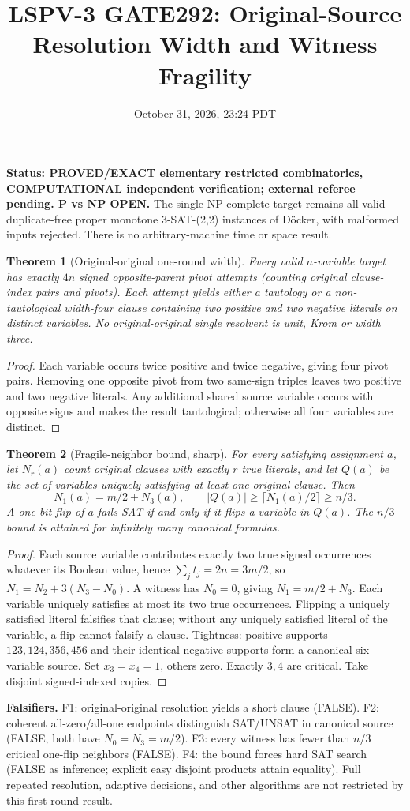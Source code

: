 \documentclass[11pt]{article}
\title{LSPV-3 GATE292: Original-Source Resolution Width and Witness Fragility}
\date{October 31, 2026, 23:24 PDT}
\newtheorem{theorem}{Theorem}
\begin{document}
\maketitle
\noindent\textbf{Status: PROVED/EXACT elementary restricted combinatorics, COMPUTATIONAL independent verification; external referee pending. P vs NP OPEN.}
The single NP-complete target remains all valid duplicate-free proper monotone 3-SAT-(2,2) instances of D\"ocker, with malformed inputs rejected. There is no arbitrary-machine time or space result.
\begin{theorem}[Original-original one-round width]
Every valid $n$-variable target has exactly $4n$ signed opposite-parent pivot attempts (counting original clause-index pairs and pivots). Each attempt yields either a tautology or a non-tautological width-four clause containing two positive and two negative literals on distinct variables. No original-original single resolvent is unit, Krom or width three.
\end{theorem}
\begin{proof}Each variable occurs twice positive and twice negative, giving four pivot pairs. Removing one opposite pivot from two same-sign triples leaves two positive and two negative literals. Any additional shared source variable occurs with opposite signs and makes the result tautological; otherwise all four variables are distinct.\end{proof}
\begin{theorem}[Fragile-neighbor bound, sharp]
For every satisfying assignment $a$, let $N_r(a)$ count original clauses with exactly $r$ true literals, and let $Q(a)$ be the set of variables uniquely satisfying at least one original clause. Then
\[
N_1(a)=m/2+N_3(a),\qquad |Q(a)|\ge\lceil N_1(a)/2\rceil\ge n/3.
\]
A one-bit flip of $a$ fails SAT if and only if it flips a variable in $Q(a)$. The $n/3$ bound is attained for infinitely many canonical formulas.
\end{theorem}
\begin{proof}Each source variable contributes exactly two true signed occurrences whatever its Boolean value, hence $\sum_jt_j=2n=3m/2$, so $N_1=N_2+3(N_3-N_0)$. A witness has $N_0=0$, giving $N_1=m/2+N_3$. Each variable uniquely satisfies at most its two true occurrences. Flipping a uniquely satisfied literal falsifies that clause; without any uniquely satisfied literal of the variable, a flip cannot falsify a clause. Tightness: positive supports $123,124,356,456$ and their identical negative supports form a canonical six-variable source. Set $x_3=x_4=1$, others zero. Exactly $3,4$ are critical. Take disjoint signed-indexed copies.\end{proof}
\noindent\textbf{Falsifiers.} F1: original-original resolution yields a short clause (FALSE). F2: coherent all-zero/all-one endpoints distinguish SAT/UNSAT in canonical source (FALSE, both have $N_0=N_3=m/2$). F3: every witness has fewer than $n/3$ critical one-flip neighbors (FALSE). F4: the bound forces hard SAT search (FALSE as inference; explicit easy disjoint products attain equality). Full repeated resolution, adaptive decisions, and other algorithms are not restricted by this first-round result.
\end{document}
